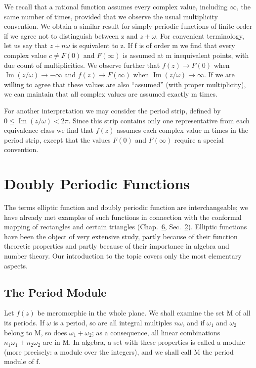 We recall that a rational function assumes every complex value, including $\infty$, the same number of times, provided that we observe the usual multiplicity convention. We obtain a similar result for simply periodic functions of finite order if we agree not to distinguish between z
and $z + \omega$. For convenient terminology, let us say that $z + n\omega$ is equivalent to z. If f is of order m we find that every complex value $c \neq F(0)$ and $F(\infty)$ is assumed at m inequivalent points, with due count of multiplicities. We observe further that $f(z) \to F(0)$ when $\operatorname{Im}(z/\omega) \to -\infty$ and $f(z) \to F(\infty)$ when $\operatorname{Im}(z/\omega) \to \infty$. If we are willing to agree that these values are also “assumed” (with proper multiplicity), we can maintain that all complex values are assumed exactly m times.

For another interpretation we may consider the period strip, defined by $0 \leq \operatorname{Im}(z/\omega) < 2\pi$. Since this strip contains only one representative from each equivalence class we find that $f(z)$ assumes each complex value m times in the period strip, except that the values $F(0)$ and $F(\infty)$ require a special convention.

\setcounter{section}{1}\section{Doubly Periodic Functions}\label{sec:7.2}
The terms elliptic function and doubly periodic function are interchangeable; we have already met examples of such functions in connection with the conformal mapping of rectangles and certain triangles (Chap.~\hyperref[chap:6]{6}, Sec.~\hyperref[sec:6.2]{2}). Elliptic functions have been the object of very extensive study, partly because of their function theoretic properties and partly because of their importance in algebra and number theory. Our introduction to the topic covers only the most elementary aspects.

\setcounter{section}{2}\setcounter{subsection}{0}\subsection{The Period Module}\label{sec:7.2.1}
Let $f(z)$ be meromorphic in the whole plane. We shall examine the set M of all its periods. If $\omega$ is a period, so are all integral multiples $n\omega$, and if $\omega_{1}$ and $\omega_{2}$ belong to M, so does $\omega_{1} + \omega_{2}$; as a consequence, all linear combinations $n_{1}\omega_{1} + n_{2}\omega_{2}$ are in M. In algebra, a set with these properties is called a module (more precisely: a module over the integers), and we shall call M the period module of f.

